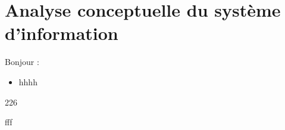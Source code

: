 \chapter[Analyse conceptuelle du système d’information]{Analyse conceptuelle du système d’information}
Bonjour :
\begin{itemize}
    \item [\ding{226}] hhhh
\end{itemize}

\begin{dinglist}{226}
    \item fff
\end{dinglist}